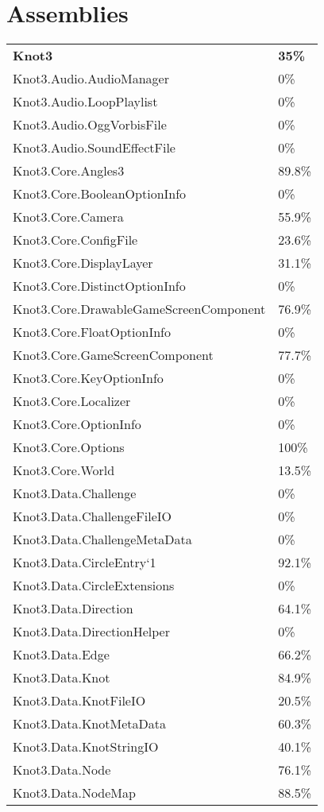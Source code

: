 \documentclass[a4paper,10pt]{article}
\begin{document}
\section{Assemblies}
\begin{longtable}[l]{ll}
\textbf{Knot3} & \textbf{35\%}\\
Knot3.Audio.AudioManager & 0\%\\
Knot3.Audio.LoopPlaylist & 0\%\\
Knot3.Audio.OggVorbisFile & 0\%\\
Knot3.Audio.SoundEffectFile & 0\%\\
Knot3.Core.Angles3 & 89.8\%\\
Knot3.Core.BooleanOptionInfo & 0\%\\
Knot3.Core.Camera & 55.9\%\\
Knot3.Core.ConfigFile & 23.6\%\\
Knot3.Core.DisplayLayer & 31.1\%\\
Knot3.Core.DistinctOptionInfo & 0\%\\
Knot3.Core.DrawableGameScreenComponent & 76.9\%\\
Knot3.Core.FloatOptionInfo & 0\%\\
Knot3.Core.GameScreenComponent & 77.7\%\\
Knot3.Core.KeyOptionInfo & 0\%\\
Knot3.Core.Localizer & 0\%\\
Knot3.Core.OptionInfo & 0\%\\
Knot3.Core.Options & 100\%\\
Knot3.Core.World & 13.5\%\\
Knot3.Data.Challenge & 0\%\\
Knot3.Data.ChallengeFileIO & 0\%\\
Knot3.Data.ChallengeMetaData & 0\%\\
Knot3.Data.CircleEntry`1 & 92.1\%\\
Knot3.Data.CircleExtensions & 0\%\\
Knot3.Data.Direction & 64.1\%\\
Knot3.Data.DirectionHelper & 0\%\\
Knot3.Data.Edge & 66.2\%\\
Knot3.Data.Knot & 84.9\%\\
Knot3.Data.KnotFileIO & 20.5\%\\
Knot3.Data.KnotMetaData & 60.3\%\\
Knot3.Data.KnotStringIO & 40.1\%\\
Knot3.Data.Node & 76.1\%\\
Knot3.Data.NodeMap & 88.5\%\\

\end{longtable}
\end{document}
